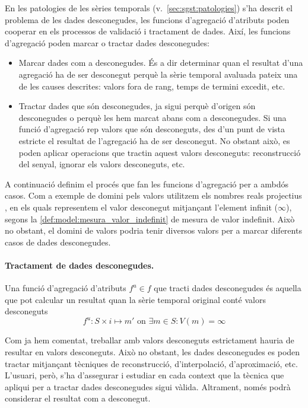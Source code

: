 En les patologies de les sèries temporals
(v.~\autoref{sec:sgst:patologies}) s'ha descrit el problema de les
dades desconegudes, les funcions d'agregació d'atributs poden cooperar
en els processos de validació i tractament de dades. Així, les
funcions d'agregació poden marcar o tractar dades desconegudes:
\begin{itemize}
\item Marcar dades com a desconegudes. És a dir determinar quan el
  resultat d'una agregació ha de ser desconegut perquè la sèrie
  temporal avaluada pateix una de les causes descrites: valors fora de
  rang, temps de termini excedit, etc.

\item Tractar dades que són desconegudes, ja sigui perquè d'origen són
  desconegudes o perquè les hem marcat abans com a desconegudes.
  Si una funció d'agregació rep valors que són desconeguts, des d'un
  punt de vista estricte el resultat de l'agregació ha de ser
  desconegut. No obstant això, es poden aplicar operacions que tractin
  aquest valors desconeguts: reconstrucció del senyal, ignorar els
  valors desconeguts, etc.
\end{itemize}

 
A continuació definim el procés que fan les funcions d'agregació per a
ambdós casos. Com a exemple de domini pels valors utilitzem els
nombres reals projectius , en els quals representem
el valor desconegut mitjançant l'element infinit ($\infty$), segons la
\autoref{def:model:mesura_valor_indefinit} de mesura de valor
indefinit. Això no obstant, el domini de valors podria tenir diversos
valors per a marcar diferents casos de dades desconegudes.

\paragraph{Tractament de dades desconegudes.}
Una funció d'agregació d'atributs $f^u \in f$ que tracti dades
desconegudes és aquella que pot calcular un resultat quan la sèrie
temporal original conté valors desconeguts
\[
f^u: S \times i \mapsto m' \text{ on } \exists m \in S: V(m)=\infty
\]

Com ja hem comentat, treballar amb valors desconeguts estrictament
hauria de resultar en valors desconeguts. Això no obstant, les dades
desconegudes es poden tractar mitjançant tècniques de reconstrucció,
d'interpolació, d'aproximació, etc. L'usuari, però, s'ha d'assegurar i
estudiar en cada context que la tècnica que apliqui per a tractar
dades desconegudes sigui vàlida. Altrament, només podrà considerar el
resultat com a desconegut.


